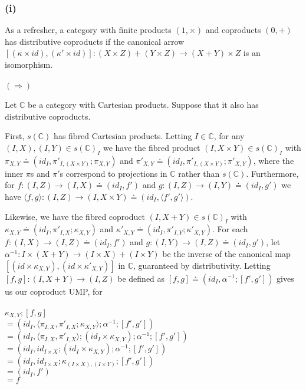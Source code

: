 \documentclass{article}
\begin{document}
\subsubsection*{(i)}

As a refresher, a category with finite products $(1,\times)$ and coproducts $(0,+)$ has distributive coproducts
if the canonical arrow $[(\kappa \times id),(\kappa' \times id)] : (X \times Z) + (Y \times Z) \to (X + Y) \times Z$ 
is an isomorphism.\\~\\

$(\Rightarrow)$

Let $\mathbb C$ be a category with Cartesian products. Suppose that it also has distributive coproducts.

First, $s(\mathbb C)$ has fibred Cartesian products. Letting $I \in \mathbb C$, for any $(I,X),(I,Y) \in s(\mathbb C)_I$
we have the fibred product $(I, X \times Y) \in s(\mathbb C)_I$ with $\pi_{X,Y} \doteq (id_I, \pi'_{I,(X \times Y)};\pi_{X,Y})$ and $\pi'_{X,Y} \doteq (id_I, \pi'_{I,(X \times Y)};\pi'_{X,Y})$, where the inner $\pi$s and $\pi'$s correspond to projections in $\mathbb C$ rather than $s(\mathbb C)$.
Furthermore, for $f : (I,Z) \to (I,X) \doteq (id_I, f')$ and $g : (I,Z) \to (I,Y) \doteq (id_I,g')$ we have
$\langle f, g \rangle : (I,Z) \to (I, X \times Y) \doteq (id_I, \langle f',g'\rangle)$.
 
Likewise, we have the fibred coproduct $(I, X + Y) \in s(\mathbb C)_I$ with 
$\kappa_{X,Y} \doteq (id_I, \pi'_{I,X};\kappa_{X,Y})$ and $\kappa'_{X,Y} \doteq (id_I, \pi'_{I,Y};\kappa'_{X,Y})$.
For each $f : (I, X) \to (I,Z) \doteq (id_I, f')$ and $g : (I,Y) \to (I,Z) \doteq (id_I, g')$,
let $\alpha^{-1} : I \times (X + Y) \to (I \times X) + (I \times Y)$ be the inverse of the canonical map
$[(id \times \kappa_{X,Y}),(id \times \kappa'_{X,Y})]$ in $\mathbb C$,
guaranteed by distributivity.
Letting $[f,g] : (I, X + Y) \to (I , Z)$ be defined as $[f,g] \doteq (id_I, \alpha^{-1};[f', g'])$ gives us our
coproduct UMP, for \\~\\
$\kappa_{X,Y};[f,g]$\\ 
$= (id_I, \langle \pi_{I,X}, \pi'_{I,X};\kappa_{X,Y} \rangle;\alpha^{-1};[f',g'])$\\
$= (id_I, \langle \pi_{I,X}, \pi'_{I,X} \rangle;(id_I \times \kappa_{X,Y});\alpha^{-1};[f',g'])$\\
$= (id_I, id_{I \times X};(id_I \times \kappa_{X,Y});\alpha^{-1};[f',g'])$\\
$= (id_I, id_{I \times X};\kappa_{(I \times X),(I \times Y)};[f',g'])$\\
$= (id_I, f')$\\
$= f$
\end{document}
